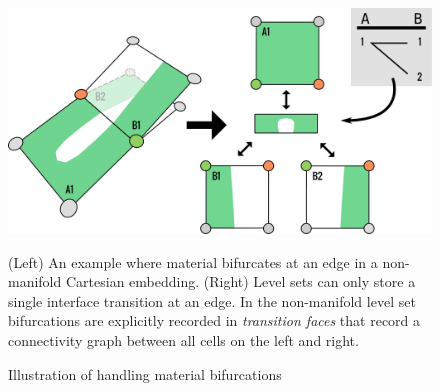 \begin{figure}
  \centering
  \includegraphics[width=.8\columnwidth]{chapter_nonmanifoldlevelsets/images/TransitionFaceNew2.pdf}
\vspace*{-.1in}
  \caption{Illustration of handling material bifurcations}{(Left) An example where material bifurcates at an edge in a
    non-manifold Cartesian embedding. (Right) Level sets can only
    store a single interface transition at an edge. In the
    non-manifold level set bifurcations are explicitly recorded in
    \emph{transition faces} that record a connectivity graph between all cells on
    the left and right.}
\vspace*{-.2in}
  \label{fig:transition-face}
\end{figure}

